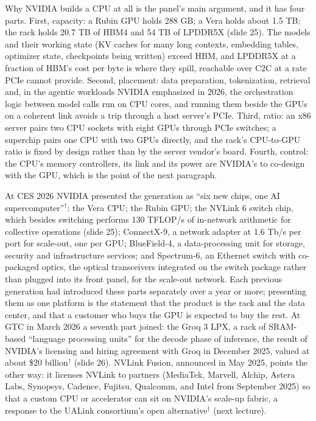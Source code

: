 \documentclass[11pt,letterpaper]{article}
\begin{document}
Why NVIDIA builds a CPU at all is the panel's main argument, and it has four parts. First, capacity: a Rubin GPU holds 288 GB; a Vera holds about 1.5 TB; the rack holds 20.7 TB of HBM4 and 54 TB of LPDDR5X (slide 25). The models and their working state (KV caches for many long contexts, embedding tables, optimizer state, checkpoints being written) exceed HBM, and LPDDR5X at a fraction of HBM's cost per byte is where they spill, reachable over C2C at a rate PCIe cannot provide. Second, placement: data preparation, tokenization, retrieval and, in the agentic workloads NVIDIA emphasized in 2026, the orchestration logic between model calls run on CPU cores, and running them beside the GPUs on a coherent link avoids a trip through a host server's PCIe. Third, ratio: an x86 server pairs two CPU sockets with eight GPUs through PCIe switches; a superchip pairs one CPU with two GPUs directly, and the rack's CPU-to-GPU ratio is fixed by design rather than by the server vendor's board. Fourth, control: the CPU's memory controllers, its link and its power are NVIDIA's to co-design with the GPU, which is the point of the next paragraph.

At CES 2026 NVIDIA presented the generation as ``six new chips, one AI supercomputer''$^\dagger$: the Vera CPU; the Rubin GPU; the NVLink 6 switch chip, which besides switching performs 130 TFLOP/s of in-network arithmetic for collective operations (slide 25); ConnectX-9, a network adapter at 1.6 Tb/s per port for scale-out, one per GPU; BlueField-4, a data-processing unit for storage, security and infrastructure services; and Spectrum-6, an Ethernet switch with co-packaged optics, the optical transceivers integrated on the switch package rather than plugged into its front panel, for the scale-out network. Each previous generation had introduced these parts separately over a year or more; presenting them as one platform is the statement that the product is the rack and the data center, and that a customer who buys the GPU is expected to buy the rest. At GTC in March 2026 a seventh part joined: the Groq 3 LPX, a rack of SRAM-based ``language processing units'' for the decode phase of inference, the result of NVIDIA's licensing and hiring agreement with Groq in December 2025, valued at about \$20 billion$^\dagger$ (slide 26). NVLink Fusion, announced in May 2025, points the other way: it licenses NVLink to partners (MediaTek, Marvell, Alchip, Astera Labs, Synopsys, Cadence, Fujitsu, Qualcomm, and Intel from September 2025) so that a custom CPU or accelerator can sit on NVIDIA's scale-up fabric, a response to the UALink consortium's open alternative$^\dagger$ (next lecture).
\end{document}
